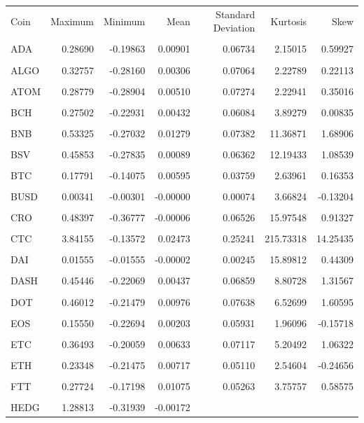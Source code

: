 \documentclass[runningheads,a4paper,10pt]{etc/llncs}
\begin{document}
\begin{longtable}{lrrrrrr}\n
\toprule
\n Coin &  Maximum &  Minimum &     Mean &  Standard Deviation &  Kurtosis &     Skew \\\\\n
\midrule\n  ADA &  0.28690 & -0.19863 &  0.00901 &             0.06734 &   2.15015 &  0.59927 \\\\\n ALGO &  0.32757 & -0.28160 &  0.00306 &             0.07064 &   2.22789 &  0.22113 \\\\\n ATOM &  0.28779 & -0.28904 &  0.00510 &             0.07274 &   2.22941 &  0.35016 \\\\\n  BCH &  0.27502 & -0.22931 &  0.00432 &             0.06084 &   3.89279 &  0.00835 \\\\\n  BNB &  0.53325 & -0.27032 &  0.01279 &             0.07382 &  11.36871 &  1.68906 \\\\\n  BSV &  0.45853 & -0.27835 &  0.00089 &             0.06362 &  12.19433 &  1.08539 \\\\\n  BTC &  0.17791 & -0.14075 &  0.00595 &             0.03759 &   2.63961 &  0.16353 \\\\\n BUSD &  0.00341 & -0.00301 & -0.00000 &             0.00074 &   3.66824 & -0.13204 \\\\\n  CRO &  0.48397 & -0.36777 & -0.00006 &             0.06526 &  15.97548 &  0.91327 \\\\\n  CTC &  3.84155 & -0.13572 &  0.02473 &             0.25241 & 215.73318 & 14.25435 \\\\\n  DAI &  0.01555 & -0.01555 & -0.00002 &             0.00245 &  15.89812 &  0.44309 \\\\\n DASH &  0.45446 & -0.22069 &  0.00437 &             0.06859 &   8.80728 &  1.31567 \\\\\n  DOT &  0.46012 & -0.21479 &  0.00976 &             0.07638 &   6.52699 &  1.60595 \\\\\n  EOS &  0.15550 & -0.22694 &  0.00203 &             0.05931 &   1.96096 & -0.15718 \\\\\n  ETC &  0.36493 & -0.20059 &  0.00633 &             0.07117 &   5.20492 &  1.06322 \\\\\n  ETH &  0.23348 & -0.21475 &  0.00717 &             0.05110 &   2.54604 & -0.24656 \\\\\n  FTT &  0.27724 & -0.17198 &  0.01075 &             0.05263 &   3.75757 &  0.58575 \\\\\n HEDG &  1.28813 & -0.31939 & -0.00172 &           
\end{longtable}
\end{document}
